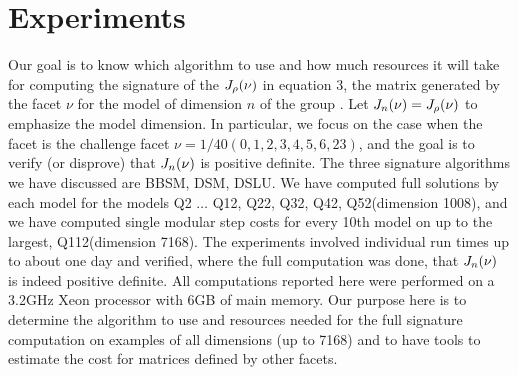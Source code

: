 \documentclass{acm_proc_article-sp}
\begin{document}
%
%
\section{Experiments} %
Our goal is to know which algorithm to use and how much resources it will take 
for computing the signature of %
the $J_{\rho}({\nu})$ in equation 3,
the matrix generated by the facet $\nu$
for the model of dimension $n$ of the group \EE.  
Let $J_{n}({\nu}) = J_{\rho}({\nu})$ to emphasize the model dimension. 
In particular, we focus on the case when
the facet is the challenge facet $\nu = 1/40 (0,1,2,3,4,5,6,23)$, 
and the goal is to verify (or disprove) that $J_{n}({\nu})$ is positive definite.  
The three signature algorithms we have discussed are BBSM, DSM, DSLU.
We have computed full solutions by each model for the models Q2 $\ldots$ Q12, Q22, Q32, Q42, Q52(dimension 1008),
and we have computed single modular step costs for every 10th model on up to the largest,
Q112(dimension 7168).
The experiments involved individual run times up to about one day and 
verified, where the full computation was done, that $J_{n}({\nu})$ is indeed positive definite.
All computations reported here were performed on a 3.2GHz Xeon processor with 6GB of main memory.
Our purpose here is to determine the algorithm to use and resources needed for the full 
signature computation on examples of all dimensions (up to 7168) and to have tools to 
estimate the cost for matrices defined by other facets.
\end{document}
